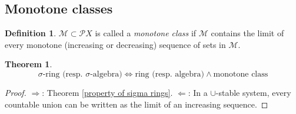\documentclass[11pt, a4paper, openany]{book}
\newtheorem{thm}{Theorem}\newtheorem{lem}{Lemma}\newtheorem{crl}{Corollary}
\theoremstyle{definition}
\newtheorem{define}{Definition}\newtheorem{exam}{Example}\newtheorem{remark}{Remark}
\begin{document}
\subsection{Monotone classes}
    \begin{define}
        $\mathscr{M}\subset\mathscr{P}X$ is called a \textit{monotone class} if $\mathscr{M}$ contains the limit of every monotone (increasing or decreasing) sequence of sets in $\mathscr{M}$.
    \end{define}
    \begin{thm}\label{characterization of sigma rings and sigma algebras via monotone classes}
        \[
            \text{$\sigma$-ring (resp. $\sigma$-algebra)}\Longleftrightarrow \text{ring (resp. algebra)}\wedge\text{monotone class}
        \]
    \end{thm}
    \begin{proof}
        $\Rightarrow$: Theorem \ref{property of sigma rings}. $\Leftarrow$: In a $\cup$-stable system, every countable union can be written as the limit of an increasing sequence.
    \end{proof}
\end{document}
